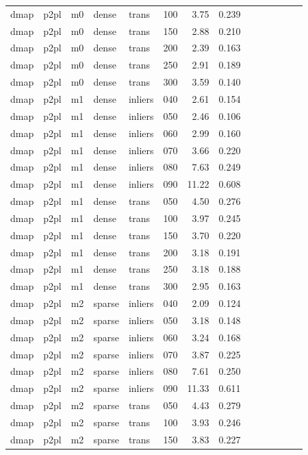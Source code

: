 \begin{table}[htbp]
\begin{tabular}{llllllrrrrrrrr}
  dmap & p2pl & m0 & dense & trans & 100 & 3.75 & 0.239 \\
  dmap & p2pl & m0 & dense & trans & 150 & 2.88 & 0.210 \\
  dmap & p2pl & m0 & dense & trans & 200 & 2.39 & 0.163 \\
  dmap & p2pl & m0 & dense & trans & 250 & 2.91 & 0.189 \\
  dmap & p2pl & m0 & dense & trans & 300 & 3.59 & 0.140 \\
  dmap & p2pl & m1 & dense & inliers & 040 & 2.61 & 0.154 \\
  dmap & p2pl & m1 & dense & inliers & 050 & 2.46 & 0.106 \\
  dmap & p2pl & m1 & dense & inliers & 060 & 2.99 & 0.160 \\
  dmap & p2pl & m1 & dense & inliers & 070 & 3.66 & 0.220 \\
  dmap & p2pl & m1 & dense & inliers & 080 & 7.63 & 0.249 \\
  dmap & p2pl & m1 & dense & inliers & 090 & 11.22 & 0.608 \\
  dmap & p2pl & m1 & dense & trans & 050 & 4.50 & 0.276 \\
  dmap & p2pl & m1 & dense & trans & 100 & 3.97 & 0.245 \\
  dmap & p2pl & m1 & dense & trans & 150 & 3.70 & 0.220 \\
  dmap & p2pl & m1 & dense & trans & 200 & 3.18 & 0.191 \\
  dmap & p2pl & m1 & dense & trans & 250 & 3.18 & 0.188 \\
  dmap & p2pl & m1 & dense & trans & 300 & 2.95 & 0.163 \\
  dmap & p2pl & m2 & sparse & inliers & 040 & 2.09 & 0.124 \\
  dmap & p2pl & m2 & sparse & inliers & 050 & 3.18 & 0.148 \\
  dmap & p2pl & m2 & sparse & inliers & 060 & 3.24 & 0.168 \\
  dmap & p2pl & m2 & sparse & inliers & 070 & 3.87 & 0.225 \\
  dmap & p2pl & m2 & sparse & inliers & 080 & 7.61 & 0.250 \\
  dmap & p2pl & m2 & sparse & inliers & 090 & 11.33 & 0.611 \\
  dmap & p2pl & m2 & sparse & trans & 050 & 4.43 & 0.279 \\
  dmap & p2pl & m2 & sparse & trans & 100 & 3.93 & 0.246 \\
  dmap & p2pl & m2 & sparse & trans & 150 & 3.83 & 0.227 \\

\end{tabular}
\end{table}
